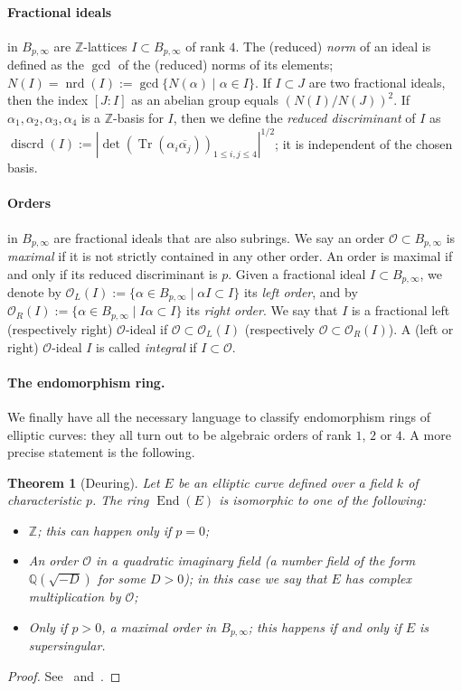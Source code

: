 \documentclass[10pt]{article}
\theoremstyle{plain}
\newtheorem{theorem}{Theorem}
\theoremstyle{definition}
\DeclareMathOperator{\End}{End} %
\DeclareMathOperator{\Tr}{Tr} %
\DeclareMathOperator{\nrd}{nrd} %
\DeclareMathOperator{\discrd}{discrd} %
\def\Z{\ensuremath{\mathbb{Z}}}
\def\O{\ensuremath{\mathcal{O}}}
\begin{document}
\paragraph{Fractional ideals} in $B_{p,\infty}$ are $\Z$-lattices
$I\subset B_{p,\infty}$ of rank $4$.
The (reduced) \emph{norm} of an ideal is defined as the
$\gcd$ of the (reduced) norms of its elements;
$N(I) = \nrd(I) := \gcd\{N(\alpha)\mid\alpha\in I\}$.
If $I\subset J$ are two fractional ideals, then the index $[J:I]$ as
an abelian group equals $\left(N(I)/N(J)\right)^2$.
If $\alpha_1,\alpha_2,\alpha_3,\alpha_4$ is a $\Z$-basis for $I$, then
we define the \emph{reduced discriminant} of $I$ as $\discrd(I) :=
|\det(\Tr(\alpha_i\overline{\alpha_j}))_{1\leq i,j\leq 4}|^{1/2}$;
it is independent of the chosen basis.

\paragraph{Orders} in $B_{p,\infty}$ are fractional ideals that are also
subrings. We say an order $\O\subset B_{p,\infty}$ is \emph{maximal} if
it is not strictly contained in any other order. An order is maximal
if and only if its reduced discriminant is $p$.
Given a fractional ideal $I\subset B_{p,\infty}$,
we denote by $\O_L(I):=\{\alpha\in B_{p,\infty}\mid \alpha I\subset I\}$
its \emph{left order},
and by $\O_R(I):=\{\alpha\in B_{p,\infty}\mid I\alpha\subset I\}$
its \emph{right order}.
We say that $I$ is a fractional left (respectively right) $\O$-ideal if
$\O\subset\O_L(I)$ (respectively $\O\subset\O_R(I)$).
A (left or right) $\O$-ideal $I$ is called \emph{integral} if $I\subset\O$.



\paragraph{The endomorphism ring.}
We finally have all the necessary language to classify endomorphism
rings of elliptic curves: they all turn out to be algebraic orders of
rank $1$, $2$ or $4$. A more precise statement is the following.

\begin{theorem}[Deuring]
  Let $E$ be an elliptic curve defined over a field $k$ of
  characteristic $p$. %
  The ring $\End(E)$ is isomorphic to one of the following:
  \begin{itemize}
  \item $ℤ$; this can happen only if $p=0$;
  \item An order $\O$ in a quadratic imaginary field (a number field
    of the form $ℚ(\sqrt{-D})$ for some $D>0$); in this case we say
    that $E$ has \emph{complex multiplication} by $\O$;
  \item Only if $p>0$, a maximal order in $B_{p,\infty}$;
  this happens if and only if $E$ is supersingular.
  \end{itemize}
\end{theorem}
\begin{proof}
  See~\cite[III, Coro.~9.4]{silverman:elliptic}
  and~\cite{kohel}.
\end{proof}
\end{document}

